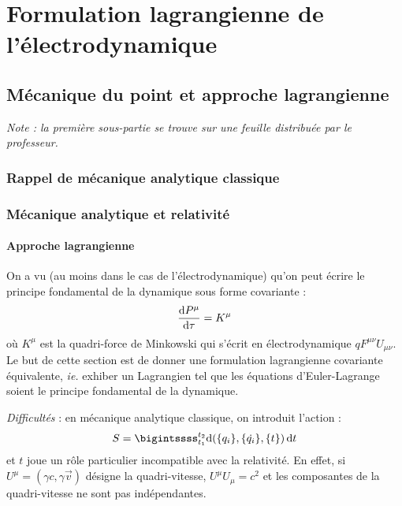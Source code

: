 \chapter{Formulation lagrangienne de l'électrodynamique}

\section{Mécanique du point et approche lagrangienne}
{\small \it Note : la première sous-partie se trouve sur une feuille distribuée par le professeur.}
\subsection{Rappel de mécanique analytique classique}
\subsection{Mécanique analytique et relativité}
\subsubsection{Approche lagrangienne}

On a vu (au moins dans le cas de l'électrodynamique) qu'on peut écrire le principe fondamental de la dynamique sous forme covariante :
$$
	\frac{\mathrm{d} P^\mu}{\mathrm{d} \tau}=K^\mu
$$
où $K^\mu$ est la quadri-force de Minkowski qui s'écrit en électrodynamique $qF^{\mu\nu}U_{\mu\nu}$. Le but de cette section est de donner une formulation lagrangienne covariante équivalente, \emph{ie.} exhiber un Lagrangien tel que les équations d'Euler-Lagrange soient le principe fondamental de la dynamique.

\emph{Difficultés }: en mécanique analytique classique, on introduit l'action :
$$
	S=\bigintssss_{t_1}^{t_2}\dif (\{q_i\},\{\dot{q_i}\},\{t\})\,\dif t
$$
et $t$ joue un rôle particulier incompatible avec la relativité. En effet, si $U^\mu=(\gamma c,\gamma \vec{v})$ désigne la quadri-vitesse, $U^\mu U_\mu = c^2$ et les composantes de la quadri-vitesse ne sont pas indépendantes.
	
